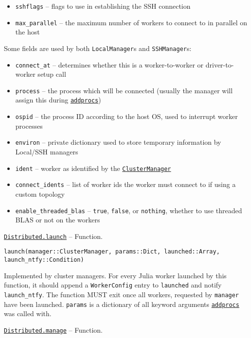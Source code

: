 \begin{adjustwidth}{2em}{0pt}
\begin{itemize}
\item \texttt{sshflags} – flags to use in establishing the SSH connection


\item \texttt{max\_parallel} – the maximum number of workers to connect to in parallel on the host

\end{itemize}
Some fields are used by both \texttt{LocalManager}s and \texttt{SSHManager}s:

\begin{itemize}
\item \texttt{connect\_at} – determines whether this is a worker-to-worker or driver-to-worker setup call


\item \texttt{process} – the process which will be connected (usually the manager will assign this during \hyperlink{2657399037748470653}{\texttt{addprocs}})


\item \texttt{ospid} – the process ID according to the host OS, used to interrupt worker processes


\item \texttt{environ} – private dictionary used to store temporary information by Local/SSH managers


\item \texttt{ident} – worker as identified by the \hyperlink{1673650075671996993}{\texttt{ClusterManager}}


\item \texttt{connect\_idents} – list of worker ids the worker must connect to if using a custom topology


\item \texttt{enable\_threaded\_blas} – \texttt{true}, \texttt{false}, or \texttt{nothing}, whether to use threaded BLAS or not on the workers

\end{itemize}


\end{adjustwidth}
\hypertarget{7346188534454273843}{} 
\hyperlink{7346188534454273843}{\texttt{Distributed.launch}}  -- {Function.}

\begin{adjustwidth}{2em}{0pt}


\begin{verbatim}
launch(manager::ClusterManager, params::Dict, launched::Array, launch_ntfy::Condition)
\end{verbatim}

Implemented by cluster managers. For every Julia worker launched by this function, it should append a \texttt{WorkerConfig} entry to \texttt{launched} and notify \texttt{launch\_ntfy}. The function MUST exit once all workers, requested by \texttt{manager} have been launched. \texttt{params} is a dictionary of all keyword arguments \hyperlink{2657399037748470653}{\texttt{addprocs}} was called with.



\end{adjustwidth}
\hypertarget{8462349151012734144}{} 
\hyperlink{8462349151012734144}{\texttt{Distributed.manage}}  -- {Function.}


